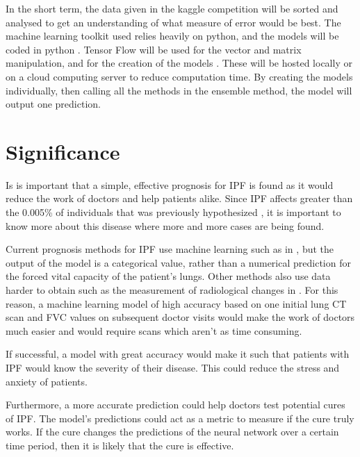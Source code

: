 \documentclass[12pt]{article}
\begin{document}
In the short term, the data given in the kaggle competition \cite{kaggle} will be sorted and analysed to get an understanding of what measure of error would be best.
The machine learning toolkit used relies heavily on python, and the models will be coded in python \cite{10.5555/1593511}. 
Tensor Flow will be used for the vector and matrix manipulation, and for the creation of the models \cite{tensorflow2015-whitepaper}. 
These will be hosted locally or on a cloud computing server to reduce computation time.
By creating the models individually, then calling all the methods in the ensemble method, the model will output one prediction.

\section*{Significance}

Is is important that a simple, effective prognosis for IPF is found as it would reduce the work of doctors and help patients alike.
Since IPF affects greater than the 0.005\% of individuals that was previously hypothesized \cite{raghu2018diagnosis}, it is important to know more about this disease where more and more cases are being found.

Current prognosis methods for IPF use machine learning such as in \cite{walsh2018deep}, but the output of the model is a categorical value, rather than a numerical prediction for the forced vital capacity of the patient's lungs.
Other methods also use data harder to obtain such as the measurement of radiological changes in \cite{maldonado2014automated}.
For this reason, a machine learning model of high accuracy based on one initial lung CT scan and FVC values on subsequent doctor visits would make the work of doctors much easier and would require scans which aren't as time consuming.

If successful, a model with great accuracy would make it such that patients with IPF would know the severity of their disease.
This could reduce the stress and anxiety of patients.

Furthermore, a more accurate prediction could help doctors test potential cures of IPF.
The model's predictions could act as a metric to measure if the cure truly works.
If the cure changes the predictions of the neural network over a certain time period, then it is likely that the cure is effective.




\end{document}
